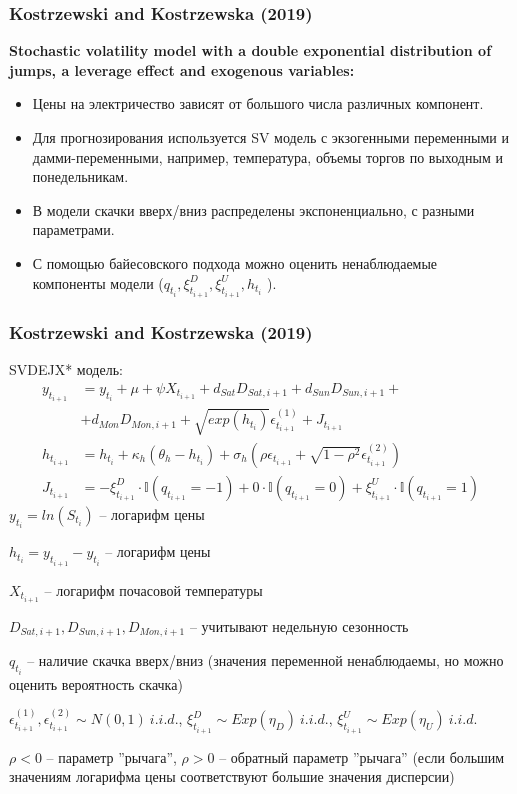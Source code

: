 \documentclass[c, dvipsnames]{beamer}  %
\begin{document}
\begin{frame}[shrink=5]
\frametitle{Kostrzewski and Kostrzewska (2019)} 
\textbf{
Stochastic
	volatility model with a double exponential distribution of jumps, a leverage
	effect and exogenous variables:
}

\begin{itemize}
	\item Цены на электричество зависят от большого числа различных компонент.

\item  Для прогнозирования используется SV модель с экзогенными переменными и дамми-переменными, например, температура, объемы торгов по выходным и понедельникам.

\item  В модели скачки вверх/вниз распределены экспоненциально, с разными параметрами.
\item  С помощью байесовского подхода можно оценить ненаблюдаемые компоненты модели ($q_{ t_{ i}}, \xi_{ t_{i+1}}^D,  \xi_{ t_{i+1}}^U, h_{ t_{ i}} $ ).


\end{itemize}


\end{frame}

\begin{frame}[shrink=5]
\frametitle{Kostrzewski and Kostrzewska (2019)} 

SVDEJX* модель: 
\begin{align*}
y_{t_{i+1}} &= y_{ t_{ i}} + \mu + \psi X_{ t_{i+1} }+ d_{ Sat} D_{ Sat,i+1} + d_{ Sun }D_{ Sun,i+1} +  \\ &+ d_{ Mon }D_{ Mon,i+1} + \sqrt{exp(h_{ t_{ i}} )}\epsilon_{ t_{ i+1} }^{(1)}+ J _{t _{i+1}}\\
h_{ t_{ i+1}} &= h_{ t_{ i}} + \kappa_{ h} (\theta_{ h} − h_{ t_{ i}} ) + \sigma_{ h} (\rho \epsilon_{ t_{ i+1}} + \sqrt{1 - \rho^2} \epsilon_{ t_{ i+1}}^{(2)}) \\
J_{ t_{ i+1}} &= -\xi_{ t_{i+1}}^D \cdot \mathbb{I}(q_{ t_{ i+1}} = -1) + 0 \cdot \mathbb{I} (q_{ t_{ i+1}} = 0) + \xi_{ t_{ i+1}}^U \cdot \mathbb{I} (q_{ t_{ i+1}} = 1)
\end{align*}
$y_{ t_{ i}} = ln(S_{ t_{ i}})$ --  логарифм цены

$h_{ t_{ i}} = y_{ t_{ i+1}} - y_{ t_{ i}}$ --  логарифм цены


$X_{ t_{i+1} }$ -- логарифм почасовой температуры

$D_{ Sat,i+1}, D_{ Sun,i+1}, D_{ Mon,i+1}$  -- учитывают недельную сезонность

$q_{ t_{ i}}$ -- наличие скачка вверх/вниз (значения переменной ненаблюдаемы, но можно оценить вероятность скачка)

$\epsilon_{ t_{ i+1} }^{(1)}, \epsilon_{ t_{ i+1} }^{(2)} \sim N(0,1) \ i.i.d.$, $\xi_{ t_{i+1}}^D \sim Exp(\eta_D) \ i.i.d. $,  
$\xi_{ t_{i+1}}^U \sim Exp(\eta_U) \ i.i.d.$

$\rho < 0$ -- параметр ''рычага'', $\rho > 0$ -- обратный параметр ''рычага'' (если большим значениям логарифма цены  соответствуют большие значения дисперсии)




\end{frame}
\end{document}
